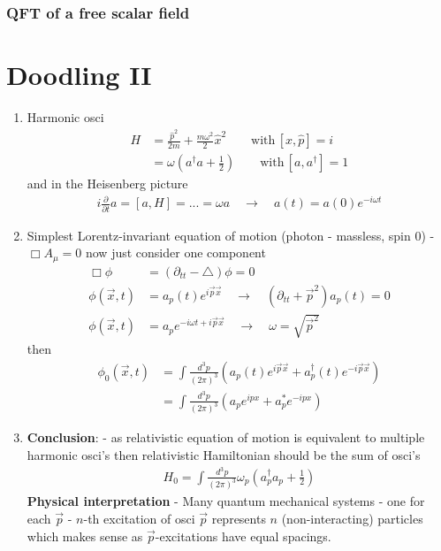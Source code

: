 \documentclass[10pt,a4paper]{book}
\theoremstyle{definition}
\begin{document}
\subsection{QFT of a free scalar field}

\newpage
\chapter{Doodling II}
\begin{enumerate}
\item Harmonic osci
\begin{align}
H&=\frac{\hat{p}^2}{2m}+\frac{m\omega^2}{2}\hat{x}^2\qquad\text{with}\,[\hat{x},\hat{p}]=i\\
&=\omega\left(a^\dagger a+\frac{1}{2}\right)\qquad\text{with}\,[a,a^\dagger]=1
\end{align}
and in the Heisenberg picture
\begin{align}
i\frac{\partial}{\partial t}a=[a,H]=...=\omega a\quad\rightarrow\quad a(t)=a(0)e^{-i\omega t}
\end{align}



\item Simplest Lorentz-invariant equation of motion (photon - massless, spin 0) - $\Box A_\mu=0$ now just consider one component
\begin{align}
\Box\phi&=(\partial_{tt}-\triangle)\phi=0\\
\phi(\vec{x},t)&=a_p(t)e^{i\vec{p}\vec{x}}\quad\rightarrow\quad(\partial_{tt}+\vec{p}^2)a_p(t)=0\\
\phi(\vec{x},t)&=a_pe^{-i\omega t+i\vec{p}\vec{x}}\quad\rightarrow\quad\omega=\sqrt{\vec{p}^2}
\end{align}
then
\begin{align}
\phi_0(\vec{x},t)
&=\int\frac{d^3p}{(2\pi)^3}\left(a_p(t)e^{i\vec{p}\vec{x}}+a_p^\dagger (t)e^{-i\vec{p}\vec{x}}\right)\\
&=\int\frac{d^3p}{(2\pi)^3}\left(a_pe^{ipx}+a_p^* e^{-ipx}\right)
\end{align}



\item {\bf Conclusion}: - as relativistic equation of motion is equivalent to multiple harmonic osci's then relativistic Hamiltonian should be the sum of osci's
\begin{align}
H_0=\int\frac{d^3p}{(2\pi)^3}\omega_p\left(a_p^\dagger a_p+\frac{1}{2}\right)
\end{align}
{\bf Physical interpretation} - Many quantum mechanical systems - one for each $\vec{p}$ -  $n$-th excitation of osci $\vec{p}$ represents $n$ (non-interacting) particles which makes sense as $\vec{p}$-excitations have equal spacings.


\end{enumerate}
\end{document}
